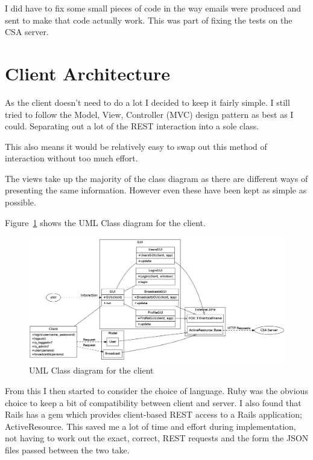 \documentclass{article}
\begin{document}
I did have to fix some small pieces of code in the way emails were produced and sent to
make that code actually work. This was part of fixing the tests on the CSA server.

\clearpage
\section{Client Architecture}
As the client doesn't need to do a lot I decided to keep it fairly simple. I still tried
to follow the Model, View, Controller (MVC) design pattern as best as I could. Separating
out a lot of the REST interaction into a sole class.

This also means it would be relatively easy to swap out this method of interaction 
without too much effort.

The views take up the majority of the class diagram as there are different ways of 
presenting the same information. However even these have been kept as simple as possible.

Figure~\ref{fig:client-uml-class} shows the UML Class diagram for the client.

\begin{figure}[h]
\centering
\includegraphics[width=.9\textheight, angle=90]{img/client-uml-class.png} 
\caption{UML Class diagram for the client}
\label{fig:client-uml-class}
\end{figure}

From this I then started to consider the choice of language. Ruby was the obvious choice
to keep a bit of compatibility between client and server. I also found that Rails has a
gem which provides client-based REST access to a Rails application; ActiveResource. This
saved me a lot of time and effort during implementation, not having to work out the 
exact, correct, REST requests and the form the JSON files passed between the two take.
\end{document}
